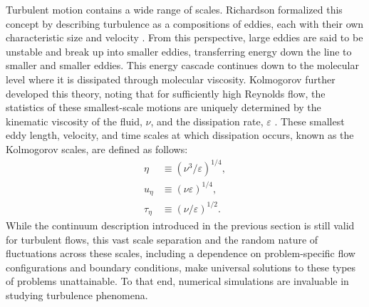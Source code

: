 Turbulent motion contains a wide range of scales. Richardson formalized this concept by describing turbulence as a compositions of eddies, each with their own characteristic size and velocity \cite{}. From this perspective, large eddies are said to be unstable and break up into smaller eddies, transferring energy down the line to smaller and smaller eddies. This energy cascade continues down to the molecular level where it is dissipated through molecular viscosity. Kolmogorov further developed this theory, noting that for sufficiently high Reynolds flow, the statistics of these smallest-scale motions are uniquely determined by the kinematic viscosity of the fluid, $\nu$, and the dissipation rate, $\varepsilon$ \cite{}. These smallest eddy length, velocity, and time scales at which dissipation occurs, known as the Kolmogorov scales, are defined as follows:
\begin{equation}\label{Kolmogorov}
\begin{aligned}
\eta &\equiv \left(  \nu^3/\varepsilon \right)^{1/4}, \\
u_{\eta} &\equiv \left(  \nu \varepsilon \right)^{1/4}, \\
\tau_{\eta} &\equiv \left(  \nu/ \varepsilon \right)^{1/2}. 
\end{aligned}
\end{equation}
While the continuum description introduced in the previous section is still valid for turbulent flows, this vast scale separation and the random nature of fluctuations across these scales, including a dependence on problem-specific flow configurations and boundary conditions, make universal solutions to these types of problems unattainable. To that end, numerical simulations are invaluable in studying turbulence phenomena. 

%
%
%


